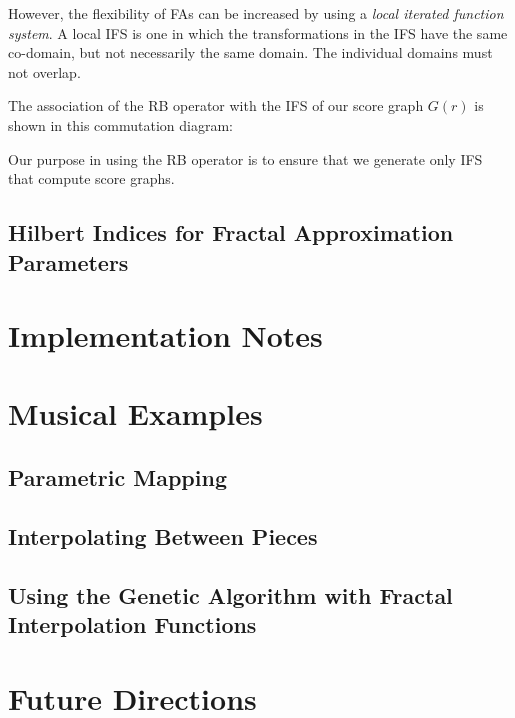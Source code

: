 \documentclass[english,11pt,letterpaper,onecolumn]{scrartcl}
\numberwithin{equation}{section}
\begin{document}

However, the flexibility of FAs can be increased by using a 
\textit{local iterated function system}. A local IFS is one in which the 
transformations in the IFS have the same co-domain, but not necessarily the 
same domain. The individual domains must not overlap.

The association of the RB operator with the IFS of our score graph $G(r)$ is 
shown in this commutation diagram:

Our purpose in using the RB operator is to ensure that we generate only IFS 
that compute score graphs.



    
    
    
    \subsection{Hilbert Indices for Fractal Approximation Parameters}
    
    \section{Implementation Notes}
    
    \section{Musical Examples}
    
    \subsection{Parametric Mapping}
    
    
    \subsection{Interpolating Between Pieces}
    
    
    \subsection{Using the Genetic Algorithm with Fractal Interpolation 
Functions}
    
    \section{Future Directions}
    
\end{document}
